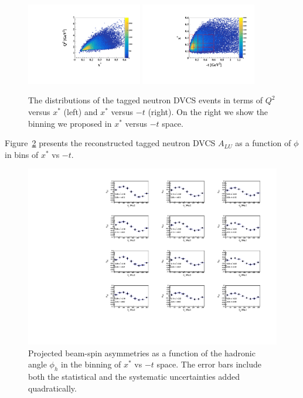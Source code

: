 \begin{figure}[htb]
  \centering
    \includegraphics[width=0.45\textwidth,clip]{figs/pdf/Q2_x*.pdf}
    \includegraphics[width=0.45\textwidth,clip]{figs/pdf/t_x*.pdf}
   \caption{The distributions of the tagged neutron DVCS events in terms of 
   $Q^2$ versus $x^*$ (left) and  $x^{*}$ versus $-t$ (right). On the right we 
   show the binning we proposed in $x^{*}$ versus $-t$ space.
   \label{fig:binning_x_t}}
\end{figure}


Figure~\ref{fig:alu_tagged} presents the reconstructed tagged neutron DVCS  
$A_{LU}$ as a function of $\phi$ in bins of $x^{*}$ vs $-t$.  

\begin{figure}[htb]
  \centering
    \includegraphics[width=1.1\textwidth,clip]{figs/pdf/BSA_incoherent_Phi_x_t.pdf}
  \caption{Projected beam-spin asymmetries as a function of the hadronic angle 
   $\phi_h$ in the binning of $x^{*}$ vs $-t$ space. The error bars include 
   both the statistical and the systematic uncertainties added quadratically.
   \label{fig:alu_tagged}}
\end{figure}




